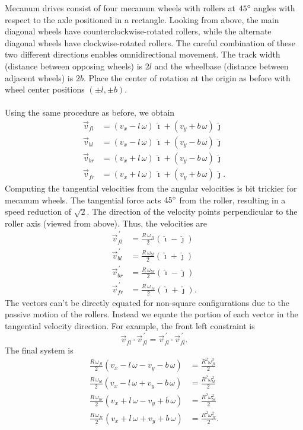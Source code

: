 \documentclass{article}
\newcommand{\pvec}[1]{\vec{#1}^{\,\prime}}
\begin{document}
Mecanum drives consist of four mecanum wheels with rollers at $45\degree$ angles with respect to the axle positioned in a rectangle. Looking from above, the main diagonal wheels have counterclockwise-rotated rollers, while the alternate diagonal wheels have clockwise-rotated rollers. The careful combination of these two different directions enables omnidirectional movement. The track width (distance between opposing wheels) is $2l$ and the wheelbase (distance between adjacent wheels) is $2b$. Place the center of rotation at the origin as before with wheel center positions \((\pm l, \pm b)\).\\
\\
Using the same procedure as before, we obtain
\begin{align*}
    \vec{v}_{fl} &= (v_x - l \, \omega) \, \hat{\imath} + (v_y + b \, \omega) \, \hat{\jmath}\\
    \vec{v}_{bl} &= (v_x - l \, \omega) \, \hat{\imath} + (v_y - b \, \omega) \, \hat{\jmath}\\
    \vec{v}_{br} &= (v_x + l \, \omega) \, \hat{\imath} + (v_y - b \, \omega) \, \hat{\jmath}\\
    \vec{v}_{fr} &= (v_x + l \, \omega) \, \hat{\imath} + (v_y + b \, \omega) \, \hat{\jmath}.
\end{align*}
Computing the tangential velocities from the angular velocities is bit trickier for mecanum wheels. The tangential force acts $45\degree$ from the roller, resulting in a speed reduction of $\sqrt{2}$. The direction of the velocity points perpendicular to the roller axis (viewed from above). Thus, the velocities are
\begin{align*}
    \pvec{v}_{fl} &= \frac{R \, \omega_{fl}}{2} (\hat{\imath} - \hat{\jmath})\\
    \pvec{v}_{bl} &= \frac{R \, \omega_{bl}}{2} (\hat{\imath} + \hat{\jmath})\\
    \pvec{v}_{br} &= \frac{R \, \omega_{br}}{2} (\hat{\imath} - \hat{\jmath})\\
    \pvec{v}_{fr} &= \frac{R \, \omega_{fr}}{2} (\hat{\imath} + \hat{\jmath}).
\end{align*}
The vectors can't be directly equated for non-square configurations due to the passive motion of the rollers. Instead we equate the portion of each vector in the tangential velocity direction. For example, the front left constraint is
\[
    \vec{v}_{fl} \cdot \pvec{v}_{fl} = \pvec{v}_{fl} \cdot \pvec{v}_{fl}.
\]
The final system is
\begin{align*}
    \frac{R \, \omega_{fl}}{2}(v_x - l \, \omega - v_y - b \, \omega) &= \frac{R^2\omega_{fl}^2}{2}\\
    \frac{R \, \omega_{bl}}{2}(v_x - l \, \omega + v_y - b \, \omega) &= \frac{R^2\omega_{bl}^2}{2}\\
    \frac{R \, \omega_{br}}{2}(v_x + l \, \omega - v_y + b \, \omega) &= \frac{R^2\omega_{br}^2}{2}\\
    \frac{R \, \omega_{fr}}{2}(v_x + l \, \omega + v_y + b \, \omega) &= \frac{R^2\omega_{fr}^2}{2}.
\end{align*}
\end{document}
